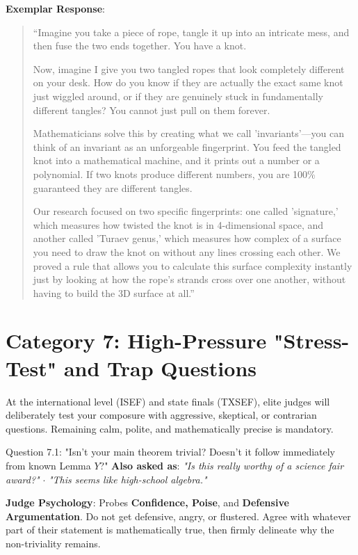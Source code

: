 \documentclass[11pt,letterpaper]{article}
\begin{document}
\begin{exemplarbox}
\textbf{Exemplar Response}:
\begin{quote}
``Imagine you take a piece of rope, tangle it up into an intricate mess, and then fuse the two ends together. You have a knot. 

Now, imagine I give you two tangled ropes that look completely different on your desk. How do you know if they are actually the exact same knot just wiggled around, or if they are genuinely stuck in fundamentally different tangles? You cannot just pull on them forever.

Mathematicians solve this by creating what we call 'invariants'---you can think of an invariant as an unforgeable fingerprint. You feed the tangled knot into a mathematical machine, and it prints out a number or a polynomial. If two knots produce different numbers, you are 100\% guaranteed they are different tangles.

Our research focused on two specific fingerprints: one called 'signature,' which measures how twisted the knot is in 4-dimensional space, and another called 'Turaev genus,' which measures how complex of a surface you need to draw the knot on without any lines crossing each other. We proved a rule that allows you to calculate this surface complexity instantly just by looking at how the rope's strands cross over one another, without having to build the 3D surface at all.''
\end{quote}
\end{exemplarbox}

\newpage
\section{Category 7: High-Pressure "Stress-Test" and Trap Questions}

At the international level (ISEF) and state finals (TXSEF), elite judges will deliberately test your composure with aggressive, skeptical, or contrarian questions. Remaining calm, polite, and mathematically precise is mandatory.

\begin{questionbox}{Question 7.1: "Isn't your main theorem trivial? Doesn't it follow immediately from known Lemma $Y$?"}
\textbf{Also asked as}: \textit{"Is this really worthy of a science fair award?"} $\cdot$ \textit{"This seems like high-school algebra."}
\end{questionbox}

\begin{strategybox}
\textbf{Judge Psychology}: Probes \textbf{Confidence, Poise}, and \textbf{Defensive Argumentation}. Do not get defensive, angry, or flustered. Agree with whatever part of their statement is mathematically true, then firmly delineate why the non-triviality remains.
\end{strategybox}
\end{document}
